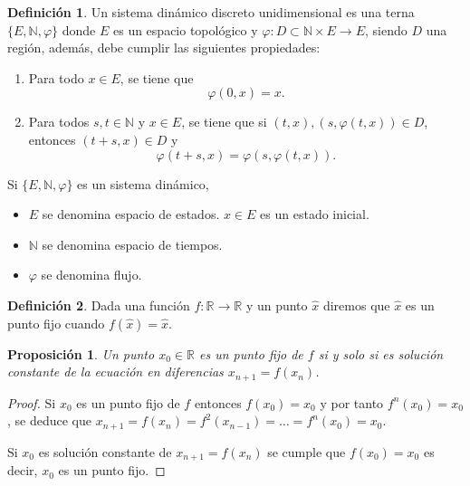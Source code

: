 \documentclass[12pt,a4paper]{report}
\newtheorem{proposicion}{Proposición}[section]
\theoremstyle{definition}
\newtheorem{definicion}{Definición}[section]
\begin{document}
\begin{definicion}

Un sistema dinámico discreto unidimensional es una terna $\{E,\mathbb{N}, \varphi\}$ donde $E$ es un espacio topológico y $\varphi: D \subset \mathbb{N} \times E \to E$, siendo $D$ una región, además, debe cumplir las siguientes propiedades:

\begin{enumerate}
    \item Para todo $x \in E$, se tiene que
    \[
    \varphi(0, x) = x.
    \]

    \item Para todos $s, t \in \mathbb{N}$ y $x \in E$, se tiene que si $(t, x), (s, \varphi(t, x)) \in D$, entonces $(t + s, x) \in D$ y
    \[
    \varphi(t + s, x) = \varphi(s, \varphi(t, x)).
    \]
\end{enumerate}


Si $\{E, \mathbb{N}, \varphi\}$ es un sistema dinámico,
\begin{itemize}
    \item $E$ se denomina espacio de estados. $x \in E$ es un estado inicial.
    \item $\mathbb{N}$ se denomina espacio de tiempos.
    \item $\varphi$ se denomina flujo.
\end{itemize}
    
\end{definicion}


\begin{definicion}
Dada una función $f: \mathbb{R} \rightarrow \mathbb{R}$ y un punto $\hat{x}$ diremos que $\hat{x}$ es un punto fijo cuando $f(\hat{x})=\hat{x}$. 
\end{definicion}
 
\begin{proposicion}
Un punto $x_0 \in \mathbb{R}$ es un punto fijo de $f $ si y solo si es solución constante de la ecuación en diferencias $x_{n+1} = f(x_n)$.
\end{proposicion}

\begin{proof}

Si $x_0$ es un punto fijo de $f$ entonces $f(x_0) = x_0$ y por tanto $f^n(x_0) = x_0$, se deduce que $x_{n+1} = f(x_n) = f^2(x_{n-1}) = \ldots = f^n(x_0) = x_0$.

Si $x_0$ es solución constante de $x_{n+1} = f(x_n)$ se cumple que $f(x_0) = x_0$ es decir, $x_0$ es un punto fijo.

\end{proof}
\end{document}
